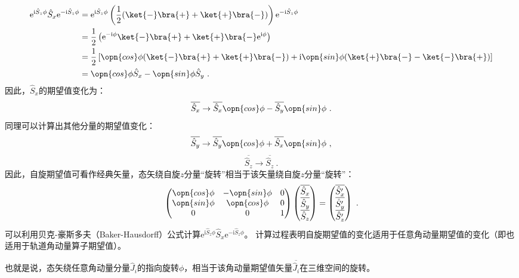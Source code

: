 \begin{equation}
\begin{aligned}
\mathrm e^{\mathrm i \hat S_z\phi}\hat S_x\mathrm e^{-\mathrm i \hat S_z\phi}&=\mathrm e^{\mathrm i \hat S_z\phi}\left(\frac{1}{2}(\ket{-}\bra{+}+\ket{+}\bra{-})\right)\mathrm e^{-\mathrm i \hat S_z\phi}\\
 &=\frac{1}{2}\left(\mathrm e^{-\mathrm i \phi}\ket{-}\bra{+}+\ket{+}\bra{-}\mathrm e^{\mathrm i \phi}\right)\\
 &=\frac{1}{2}\left[\opn{cos}\phi(\ket{-}\bra{+}+\ket{+}\bra{-})+\mathrm i\opn{sin}\phi(\ket{+}\bra{-}-\ket{-}\bra{+})\right]\\
 &=\opn{cos}\phi \hat S_x-\opn{sin}\phi \hat S_y~.
\end{aligned}
\end{equation}
因此，$\hat S_x$的期望值变化为：
\begin{equation}
\overline{\hat S_x}\rightarrow  \overline{\hat S_x}\opn{cos}\phi-\overline{\hat S_y}\opn{sin}\phi~.
\end{equation}
同理可以计算出其他分量的期望值变化：
\begin{equation}
\overline{\hat S_y}\rightarrow \overline{\hat S_y}\opn{cos}\phi+\overline{\hat S_x}\opn{sin}\phi~,
\end{equation}
\begin{equation}
\overline{\hat S_z}\rightarrow \overline{\hat S_z}~.
\end{equation}
因此，自旋期望值可看作经典矢量，态矢绕自旋$z$分量“旋转”相当于该矢量绕自旋$z$分量“旋转”：
\begin{equation}
\begin{pmatrix}
 \opn{cos}\phi &-\opn{sin}\phi  &0 \\
  \opn{sin}\phi & \opn{cos}\phi  & 0\\
  0& 0 &1
\end{pmatrix}
\begin{pmatrix}
 \overline{\hat S_x}\\
  \overline{\hat S_y}\\
 \overline{\hat S_z}
\end{pmatrix}
=
\begin{pmatrix}
  \overline{\hat S'_x}\\
  \overline{\hat S'_y}\\
 \overline{\hat S'_z}
\end{pmatrix}~.
\end{equation}
可以利用贝克-豪斯多夫（Baker-Hausdorff）公式计算$\mathrm e^{\mathrm i \hat S_z\phi}\hat S_x\mathrm e^{-\mathrm i \hat S_z\phi}$。
计算过程表明自旋期望值的变化适用于任意角动量期望值的变化（即也适用于轨道角动量算子期望值）。

也就是说，态矢绕任意角动量分量$\hat J_i$的指向旋转$\phi$，相当于该角动量期望值矢量$\overline{\hat J_i}$在三维空间的旋转。

